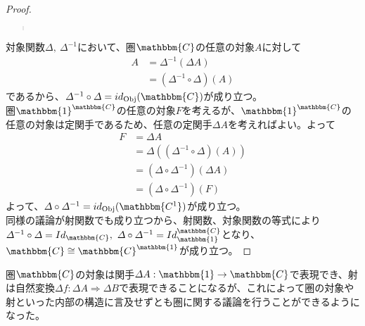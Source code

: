 \documentclass[uplatex,dvipdfmx]{jsarticle}
\newcommand{\cat}[1]{\mathbbm{#1}}
\newcommand{\arrow}{\rightarrow}
\newcommand{\functor}[3]{#1:\cat{#2}\arrow \cat{#3}}
\newcommand{\nat}[3]{#1:#2\Rightarrow #3}
\newcommand{\obj}[1]{\mathrm{Obj}(\cat{#1})}
\newcommand{\funccat}[2]{\cat{#2}^\cat{#1}}
\newtheorem{proof}{証明}[section]
\numberwithin{proof}{subsection}
\numberwithin{prop}{subsection}
\numberwithin{define}{subsection}
\begin{document}
\begin{proof}
\begin{quote}
\begin{description}
\begin{align*}
        \end{align*}
			\end{description}
		\end{quote}
    対象関数$\varDelta,\ \varDelta^{-1}$において、圏$\cat{C}$の任意の対象$A$に対して
    \begin{align*}
      A&=\varDelta^{-1}(\varDelta A)\\
      &=(\varDelta^{-1}\circ\varDelta)(A)
    \end{align*}
    であるから、$\varDelta^{-1}\circ\varDelta=id_\obj{C}$が成り立つ。\\
    圏$\funccat{C}{1}$の任意の対象$F$を考えるが、$\funccat{C}{1}$の任意の対象は定関手であるため、任意の定関手$\varDelta A$を考えればよい。よって
    \begin{align*}
      F&=\varDelta A\\
      &=\varDelta((\varDelta^{-1}\circ\varDelta)(A))\\
      &=(\varDelta\circ \varDelta^{-1})(\varDelta A)\\
      &=(\varDelta\circ \varDelta^{-1})(F)
    \end{align*}
    よって、$\varDelta\circ\varDelta^{-1}=id_\obj{C^1}$が成り立つ。\\
    同様の議論が射関数でも成り立つから、射関数、対象関数の等式により$\varDelta^{-1}\circ\varDelta=Id_\cat{C},\ \varDelta\circ\varDelta^{-1}=Id_\funccat{C}{1}$となり、$\cat{C}\cong\funccat{1}{C}$が成り立つ。
  \end{proof}
  圏$\cat{C}$の対象は関手$\functor{\varDelta A}{1}{C}$で表現でき、射は自然変換$\nat{\varDelta f}{\varDelta A}{\varDelta B}$で表現できることになるが、これによって圏の対象や射といった内部の構造に言及せずとも圏に関する議論を行うことができるようになった。\\
\end{document}
